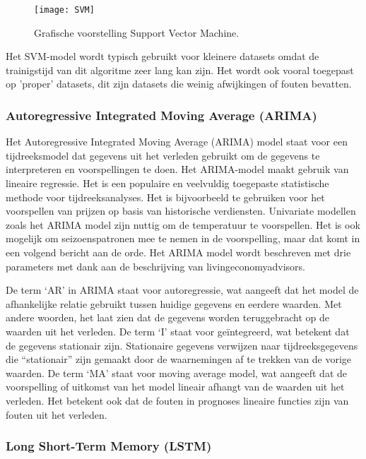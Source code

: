\begin{figure}[h!]
    \centering\texttt{[image: SVM]}
    \caption{\label{fig:SVM}Grafische voorstelling Support Vector Machine.}
\end{figure} 

Het SVM-model wordt typisch gebruikt voor kleinere datasets omdat de trainigstijd van dit algoritme zeer lang kan zijn. Het wordt ook vooral toegepast op 'proper' datasets, dit zijn datasets die weinig afwijkingen of fouten bevatten.

\subsubsection{Autoregressive Integrated Moving Average (ARIMA)}

Het Autoregressive Integrated Moving Average (ARIMA) model staat voor een tijdreeksmodel dat gegevens uit het verleden gebruikt om de gegevens te interpreteren en voorspellingen te doen. Het ARIMA-model maakt gebruik van lineaire regressie. Het is een populaire en veelvuldig toegepaste statistische methode voor tijdreeksanalyses. Het is bijvoorbeeld te gebruiken voor het voorspellen van prijzen op basis van historische verdiensten. Univariate modellen zoals het ARIMA model zijn nuttig om de temperatuur te voorspellen. Het is ook mogelijk om seizoenspatronen mee te nemen in de voorspelling, maar dat komt in een volgend bericht aan de orde. Het ARIMA model wordt beschreven met drie parameters met dank aan de beschrijving van livingeconomyadvisors.

De term ‘AR’ in ARIMA staat voor autoregressie, wat aangeeft dat het model de afhankelijke relatie gebruikt tussen huidige gegevens en eerdere waarden. Met andere woorden, het laat zien dat de gegevens worden teruggebracht op de waarden uit het verleden.
De term ‘I’ staat voor geïntegreerd, wat betekent dat de gegevens stationair zijn. Stationaire gegevens verwijzen naar tijdreeksgegevens die “stationair” zijn gemaakt door de waarnemingen af ​​te trekken van de vorige waarden.
De term ‘MA’ staat voor moving average model, wat aangeeft dat de voorspelling of uitkomst van het model lineair afhangt van de waarden uit het verleden. Het betekent ook dat de fouten in prognoses lineaire functies zijn van fouten uit het verleden.

\subsubsection{Long Short-Term Memory (LSTM)}

